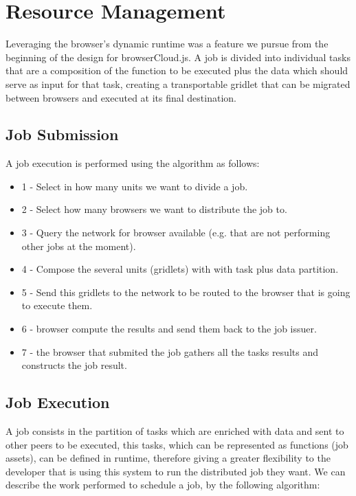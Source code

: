 \section{Resource Management}

Leveraging the browser's dynamic runtime was a feature we pursue from the beginning of the design for browserCloud.js. A job is divided into individual tasks that are a composition of the function to be executed plus the data which should serve as input for that task, creating a transportable gridlet that can be migrated between browsers and executed at its final destination.

\subsection{Job Submission}

A job execution is performed using the algorithm as follows:

\begin{itemize}
    \item 1 - Select in how many units we want to divide a job.
    \item 2 - Select how many browsers we want to distribute the job to.
    \item 3 - Query the network for browser available (e.g. that are not performing other jobs at the moment).
    \item 4 - Compose the several units (gridlets) with with task plus data partition.
    \item 5 - Send this gridlets to the network to be routed to the browser that is going to execute them.
    \item 6 - browser compute the results and send them back to the job issuer.
    \item 7 - the browser that submited the job gathers all the tasks results and constructs the job result.
\end{itemize}

\subsection{Job Execution}

A job consists in the partition of tasks which are enriched with data and sent to other peers to be executed, this tasks, which can be represented as functions (job assets), can be defined in runtime, therefore giving a greater flexibility to the developer that is using this system to run the distributed job they want. We can describe the work performed to schedule a job, by the following algorithm:

